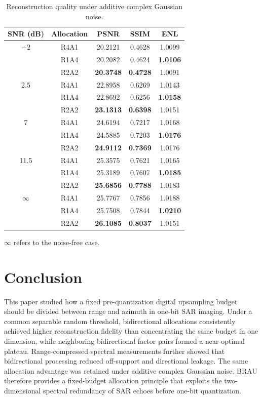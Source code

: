 \documentclass[conference]{IEEEtran}
\begin{document}
\begin{table}[!t]
\caption{Reconstruction quality under additive complex Gaussian noise.}
\label{tab:noise_ablation}
\centering
\scriptsize
\renewcommand{\arraystretch}{0.84}
\setlength{\tabcolsep}{5pt}
\begin{tabular}{c c c c c}
\hline
SNR (dB) & Allocation & PSNR & SSIM & ENL \\
\hline
$-2$ & R4A1 & 20.2121 & 0.4628 & 1.0099 \\
     & R1A4 & 20.2082 & 0.4624 & \textbf{1.0106} \\
     & R2A2 & \textbf{20.3748} & \textbf{0.4728} & 1.0091 \\
\hline
2.5 & R4A1 & 22.8958 & 0.6269 & 1.0143 \\
    & R1A4 & 22.8692 & 0.6256 & \textbf{1.0158} \\
    & R2A2 & \textbf{23.1313} & \textbf{0.6398} & 1.0151 \\
\hline
7 & R4A1 & 24.6194 & 0.7217 & 1.0168 \\
  & R1A4 & 24.5885 & 0.7203 & \textbf{1.0176} \\
  & R2A2 & \textbf{24.9112} & \textbf{0.7369} & 1.0176 \\
\hline
11.5 & R4A1 & 25.3575 & 0.7621 & 1.0165 \\
     & R1A4 & 25.3189 & 0.7607 & \textbf{1.0185} \\
     & R2A2 & \textbf{25.6856} & \textbf{0.7788} & 1.0183 \\
\hline
$\infty$ & R4A1 & 25.7767 & 0.7856 & 1.0188 \\
         & R1A4 & 25.7508 & 0.7844 & \textbf{1.0210} \\
         & R2A2 & \textbf{26.1085} & \textbf{0.8037} & 1.0151 \\
\hline
\end{tabular}

\vspace{2pt}
\parbox{0.96\linewidth}{\footnotesize  $\infty$ refers to the noise-free case.}
\end{table}

\section{Conclusion}

This paper studied how a fixed pre-quantization digital upsampling budget should be divided between range and azimuth in one-bit SAR imaging. Under a common separable random threshold, bidirectional allocations consistently achieved higher reconstruction fidelity than concentrating the same budget in one dimension, while neighboring bidirectional factor pairs formed a near-optimal plateau. Range-compressed spectral measurements further showed that bidirectional processing reduced off-support and directional leakage. The same allocation advantage was retained under additive complex Gaussian noise. BRAU therefore provides a fixed-budget allocation principle that exploits the two-dimensional spectral redundancy of SAR echoes before one-bit quantization.
\end{document}
